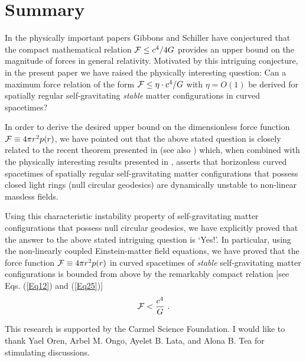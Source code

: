 \documentclass[preprintnumbers,amsmath,amssymbm,prd]{revtex4}
\begin{document}
\section{Summary}

In the physically important papers \cite{Gib,Sch1} Gibbons and Schiller have conjectured that the 
compact mathematical relation ${\cal F} \leq c^4/4G$ provides an upper bound on the magnitude of 
forces in general relativity. 
Motivated by this intriguing conjecture, in the present paper we have raised the physically interesting 
question: Can a maximum force relation of the form ${\cal F}\leq \eta\cdot c^4/G$ with $\eta=O(1)$ 
be derived for spatially regular self-gravitating {\it stable} matter configurations in curved spacetimes?

In order to derive the desired upper bound on the dimensionless force function ${\cal F}\equiv 4\pi r^2 p(r)$, 
we have pointed out that the above stated question is closely related to the recent
theorem presented in \cite{CBH} (see also \cite{Hodrw,Hoddd}) which, when combined with the physically 
interesting results presented in \cite{Keir,HerNew}, asserts that horizonless curved spacetimes of 
spatially regular self-gravitating matter configurations that possess closed light rings (null circular geodesics) 
are dynamically unstable to non-linear massless fields.

Using this characteristic instability property of self-gravitating matter configurations that possess null 
circular geodesics, we have explicitly proved that the answer to the
above stated intriguing question is `Yes!'. 
In particular, using the non-linearly coupled 
Einstein-matter field equations, we have proved that the force function ${\cal F}\equiv 4\pi r^2 p(r)$ in curved 
spacetimes of {\it stable} self-gravitating matter configurations is bounded from above by the remarkably 
compact relation [see Eqs. (\ref{Eq12}) and (\ref{Eq25})]
\begin{equation}\label{Eq26}
{\cal F}<{{c^4}\over{G}}\  .
\end{equation}

\bigskip
{}

This research is supported by the Carmel Science Foundation. I would
like to thank Yael Oren, Arbel M. Ongo, Ayelet B. Lata, and Alona B.
Tea for stimulating discussions.
\end{document}
